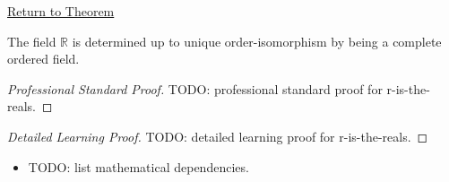\newpage
{}
\label{prf:r-is-the-reals}

\begin{remark*}[Return]
\hyperref[cor:r-is-the-reals]{Return to Theorem}
\end{remark*}

\begin{corollary*}
The field $\mathbb{R}$ is determined up to unique order-isomorphism by being a
complete ordered field.
\end{corollary*}

\begin{proof}[Professional Standard Proof]
\LRAProofBodyStart
TODO: professional standard proof for r-is-the-reals.
\end{proof}

\begin{proof}[Detailed Learning Proof]
\LRAProofBodyStart
TODO: detailed learning proof for r-is-the-reals.
\end{proof}

\begin{remark*}
\end{remark*}

\begin{dependencies}
\begin{itemize}
  \item TODO: list mathematical dependencies.
\end{itemize}
\end{dependencies}

\clearpage
